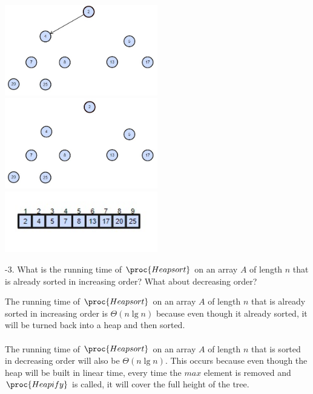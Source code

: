 \documentclass[addpoints,11pt]{exam}
\begin{document}
\begin{questions}
\begin{solutionorbox}
	\includegraphics[width=0.5\textwidth]{heapsort7.jpg}
	\includegraphics[width=0.5\textwidth]{heapsort8.jpg}
	\includegraphics[width=0.5\textwidth]{heapsort9.jpg}
\end{solutionorbox}

\ifprintanswers
\newpage
\else
\bigskip
\fi


%
%
-3.  What is the running time of $\proc{Heapsort}$ on an array $A$ of length $n$ that is already sorted in increasing order?  What about decreasing order?

\begin{solutionorbox}
	The running time of $\proc{Heapsort}$ on an array $A$ of length $n$ that is already sorted in increasing order is $\Theta(n \lg n)$ because even though it already sorted, it will be turned back into a heap and then sorted.\\ \\
	The running time of $\proc{Heapsort}$ on an array $A$ of length $n$ that is sorted in decreasing order will also be $\Theta(n \lg n)$. This occurs because even though the heap will be built in linear time, every time the $max$ element is removed and $\proc{Heapify}$ is called, it will cover the full height of the tree.
\end{solutionorbox}

\ifprintanswers
\newpage
\else
\bigskip
\fi





\end{questions}
\end{document}
